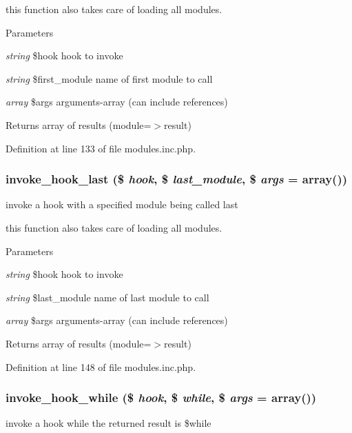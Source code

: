 this function also takes care of loading all modules. 
\begin{DoxyParams}{Parameters}
\item[{\em string}]\$hook hook to invoke \item[{\em string}]\$first\_\-module name of first module to call \item[{\em array}]\$args arguments-\/array (can include references) \end{DoxyParams}
\begin{DoxyReturn}{Returns}
array of results (module=$>$result) 
\end{DoxyReturn}


Definition at line 133 of file modules.inc.php.

\hypertarget{modules_8inc_8php_ae1ff036fae9d272fe1d58dff8a9caed2}{
\subsubsection[{invoke\_\-hook\_\-last}]{\setlength{\rightskip}{0pt plus 5cm}invoke\_\-hook\_\-last (\$ {\em hook}, \/  \$ {\em last\_\-module}, \/  \$ {\em args} = {\ttfamily array()})}}
\label{modules_8inc_8php_ae1ff036fae9d272fe1d58dff8a9caed2}
invoke a hook with a specified module being called last

this function also takes care of loading all modules. 
\begin{DoxyParams}{Parameters}
\item[{\em string}]\$hook hook to invoke \item[{\em string}]\$last\_\-module name of last module to call \item[{\em array}]\$args arguments-\/array (can include references) \end{DoxyParams}
\begin{DoxyReturn}{Returns}
array of results (module=$>$result) 
\end{DoxyReturn}


Definition at line 148 of file modules.inc.php.

\hypertarget{modules_8inc_8php_a66473fc9f24153d85053f1f9c6ed83e4}{
\subsubsection[{invoke\_\-hook\_\-while}]{\setlength{\rightskip}{0pt plus 5cm}invoke\_\-hook\_\-while (\$ {\em hook}, \/  \$ {\em while}, \/  \$ {\em args} = {\ttfamily array()})}}
\label{modules_8inc_8php_a66473fc9f24153d85053f1f9c6ed83e4}
invoke a hook while the returned result is \$while

